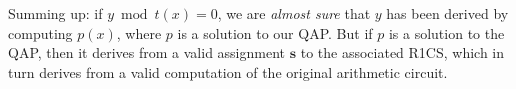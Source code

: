 Summing up: if \(y \bmod t\left(x\right) = 0\), we are \emph{almost sure} that \(y\) has been 
derived by computing \(p\left(x\right)\), where \(p\) is a solution to our QAP\@.
But if \(p\) is a solution to the QAP, then it derives from a valid assignment \(\bm{s}\) to the
associated R1CS, which in turn derives from a valid computation of the original arithmetic circuit.
